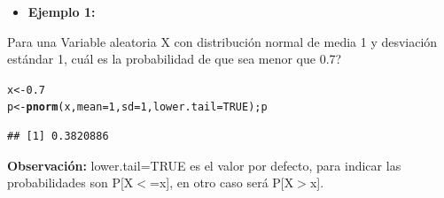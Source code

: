 \documentclass[12pt,letterpaper]{article}\usepackage[]{graphicx}\usepackage[]{color}
\makeatletter
\newcommand{\hlnum}[1]{\textcolor[rgb]{0.686,0.059,0.569}{#1}}%
\newcommand{\hlstd}[1]{\textcolor[rgb]{0.345,0.345,0.345}{#1}}%
\newcommand{\hlkwb}[1]{\textcolor[rgb]{0.69,0.353,0.396}{#1}}%
\newcommand{\hlkwc}[1]{\textcolor[rgb]{0.333,0.667,0.333}{#1}}%
\newcommand{\hlkwd}[1]{\textcolor[rgb]{0.737,0.353,0.396}{\textbf{#1}}}%
\newenvironment{kframe}{%
 \def\at@end@of@kframe{}%
 \ifinner\ifhmode%
  \def\at@end@of@kframe{\end{minipage}}%
  \begin{minipage}{\columnwidth}%
 \fi\fi%
 \def\FrameCommand##1{\hskip\@totalleftmargin \hskip-\fboxsep
 \colorbox{shadecolor}{##1}\hskip-\fboxsep
     \hskip-\linewidth \hskip-\@totalleftmargin \hskip\columnwidth}%
 \MakeFramed {\advance\hsize-\width
   \@totalleftmargin\z@ \linewidth\hsize
   \@setminipage}}%
 {\par\unskip\endMakeFramed%
 \at@end@of@kframe}
\newenvironment{knitrout}{}{} %
\makeatother
\begin{document}
\begin{itemize}
  \item \textbf{Ejemplo 1:}
\end{itemize}
Para una Variable aleatoria X con distribuci\'on normal de media 1 y desviaci\'on 
est\'andar 1, \¿cu\'al es la probabilidad de que sea menor que 0.7?
\begin{knitrout}
\color{fgcolor}\begin{kframe}
\begin{alltt}
\hlstd{x} \hlkwb{<-} \hlnum{0.7}
\hlstd{p} \hlkwb{<-} \hlkwd{pnorm}\hlstd{(x,} \hlkwc{mean}\hlstd{=}\hlnum{1}\hlstd{,} \hlkwc{sd}\hlstd{=}\hlnum{1}\hlstd{,} \hlkwc{lower.tail} \hlstd{=} \hlnum{TRUE}\hlstd{); p}
\end{alltt}
\begin{verbatim}
## [1] 0.3820886
\end{verbatim}
\end{kframe}
\end{knitrout}
\textbf{Observaci\'on:} lower.tail=TRUE es el valor por defecto, para indicar las probabilidades son P[X$<$=x], en otro caso ser\'a P[X$>$x].\\
\end{document}
